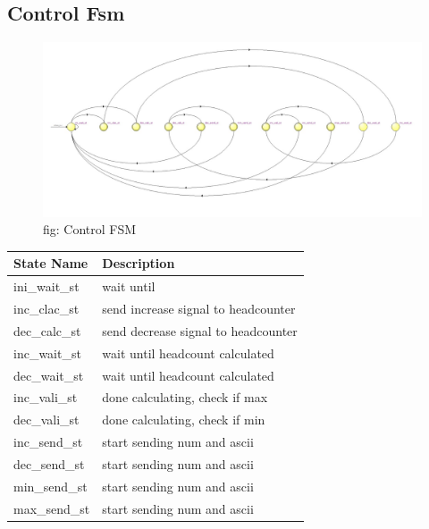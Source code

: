 \documentclass[12pt,a4 paper] {report}
\begin{document}
\subsection{Control Fsm}
\begin{figure}[h]
	\centering	
	\includegraphics[scale=0.3]{../png/Control.png}
	\newline
	fig: Control FSM\\
\end{figure}
\begin{center}
 \begin{tabular}{| p{4cm} | p{7cm} |}
	 \hline
	 \textbf{State Name} & \textbf{Description} \\
	 \hline
	 ini\_wait\_st & wait until \\
	 \hline
	 inc\_clac\_st & send increase signal to headcounter \\
	 \hline
	 dec\_calc\_st & send decrease signal to headcounter \\
	 \hline
	 inc\_wait\_st & wait until headcount calculated \\
	 \hline
	 dec\_wait\_st & wait until headcount calculated \\
	 \hline
	 inc\_vali\_st & done calculating, check if max \\
	 \hline
	 dec\_vali\_st & done calculating, check if min \\
	 \hline
	 inc\_send\_st & start sending num and ascii \\
	 \hline
	 dec\_send\_st & start sending num and ascii \\
	 \hline
	 min\_send\_st & start sending num and ascii \\
	 \hline
	 max\_send\_st & start sending num and ascii \\
	 \hline
 \end{tabular}
\end{center}
\end{document}
